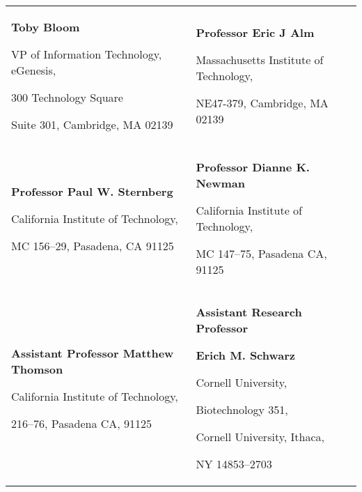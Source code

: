 
\begin{tabularx}{\textwidth}{@{}X X@{}}
  \textbf{Toby Bloom}\par
    VP of Information Technology, eGenesis,\par
    300 Technology Square\par
    Suite 301, Cambridge, MA 02139\par
    \makefield{\faEnvelopeO}{\url{tbloom@alum.mit.edu}}

  &

  \textbf{Professor Eric J Alm}\par
    Massachusetts Institute of Technology,\par
    NE47-379, Cambridge, MA 02139\par
    \makefield{\faEnvelopeO}{\url{burnss@mit.edu}}\\

  \textbf{Professor Paul W. Sternberg}\par
    California Institute of Technology,\par
    MC 156--29, Pasadena, CA 91125\par
    \makefield{\faEnvelopeO}{\url{pws@caltech.edu}}

  &
  \textbf{Professor Dianne K. Newman}\par
    California Institute of Technology,\par
    MC 147--75, Pasadena CA, 91125\par
    \makefield{\faEnvelopeO}{\url{dkn@caltech.edu}}\\

  \vspace{3mm}

  \textbf{Assistant Professor Matthew Thomson}\par
    California Institute of Technology,\par
    216--76, Pasadena CA, 91125\par
    \makefield{\faEnvelopeO}{\url{mthomson@caltech.edu}}
  &
  \vspace{3mm}
  \textbf{Assistant Research Professor}\par
  \textbf{Erich M. Schwarz}\par
    Cornell University,\par
    Biotechnology 351,\par
    Cornell University, Ithaca,\par
    NY 14853--2703\par
    \makefield{\faEnvelopeO}{\url{ems394@cornell.edu}}
\end{tabularx}
